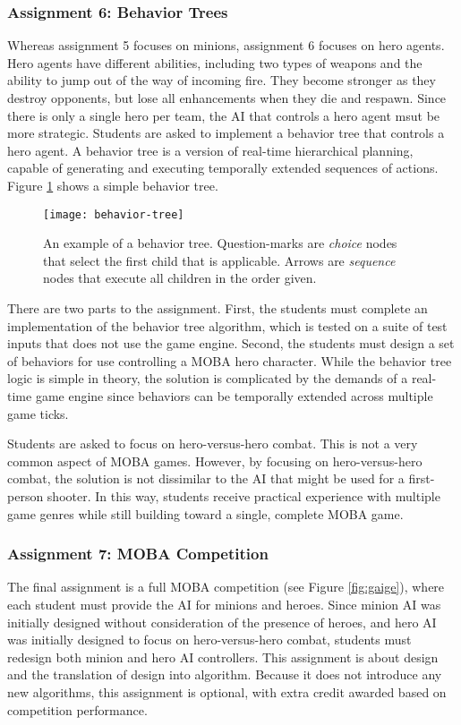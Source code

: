 \documentclass[letterpaper]{article}
\begin{document}
\subsubsection{Assignment 6: Behavior Trees}
Whereas assignment 5 focuses on minions, assignment 6 focuses on hero agents.
Hero agents have different abilities, including two types of weapons and the ability to jump out of the way of incoming fire. 
They become stronger as they destroy opponents, but lose all enhancements when they die and respawn. 
Since there is only a single hero per team, the AI that controls a hero agent msut be more strategic. 
Students are asked to implement a behavior tree that controls a hero agent.
A behavior tree is a version of real-time hierarchical planning, capable of generating and executing temporally extended sequences of actions. 
Figure \ref{fig:behavior-tree} shows a simple behavior tree.

\begin{figure}
\centering
\texttt{[image: behavior-tree]}
\caption{An example of a behavior tree. 
Question-marks are {\em choice} nodes that select the first child that is applicable. 
Arrows are {\em sequence} nodes that execute all children in the order given.
}
\label{fig:behavior-tree}
\end{figure}

There are two parts to the assignment.
First, the students must complete an implementation of the behavior tree algorithm, which is tested on a suite of test inputs that does not use the game engine.
Second, the students must design a set of behaviors for use controlling a MOBA hero character.
While the behavior tree logic is simple in theory, the solution is complicated by the demands of a real-time game engine since behaviors can be temporally extended across multiple game ticks.

Students are asked to focus on hero-versus-hero combat. 
This is not a very common aspect of MOBA games.
However, by focusing on hero-versus-hero combat, the solution is not dissimilar to the AI that might be used for a first-person shooter. 
In this way, students receive practical experience with multiple game genres while still building toward a single, complete MOBA game.

\subsubsection{Assignment 7: MOBA Competition}
The final assignment is a full MOBA competition (see Figure \ref{fig:gaige}), where each student must provide the AI for minions and heroes.
Since minion AI was initially designed without consideration of the presence of heroes, and hero AI was initially designed to focus on hero-versus-hero combat, students must redesign both minion and hero AI controllers. 
This assignment is about design and the translation of design into algorithm.
Because it does not introduce any new algorithms, this assignment is optional, with extra credit awarded based on competition performance.
\end{document}
